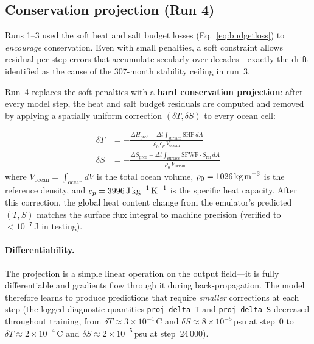 \documentclass[11pt]{article}
\begin{document}
\subsection{Conservation projection (Run 4)}
\label{sec:conservproj}

Runs 1--3 used the soft heat and salt budget losses (Eq.~\ref{eq:budgetloss}) to
\emph{encourage} conservation. Even with small penalties, a soft constraint allows
residual per-step errors that accumulate secularly over decades---exactly the drift
identified as the cause of the 307-month stability ceiling in run~3.

Run~4 replaces the soft penalties with a \textbf{hard conservation projection}: after
every model step, the heat and salt budget residuals are computed and removed by applying
a spatially uniform correction $(\delta T, \delta S)$ to every ocean cell:

\begin{align}
\delta T &= -\frac{\Delta H_\text{pred} - \Delta t \int_\text{surface} \text{SHF}\,dA}
                  {\rho_0\,c_p\,V_\text{ocean}}
\label{eq:projdT}\\
\delta S &= -\frac{\Delta S_\text{pred} - \Delta t \int_\text{surface} \text{SFWF}\cdot S_\text{ref}\,dA}
                  {\rho_0\,V_\text{ocean}}
\label{eq:projdS}
\end{align}
where $V_\text{ocean} = \int_\text{ocean} dV$ is the total ocean volume,
$\rho_0 = 1026\,\text{kg\,m}^{-3}$ is the reference density, and
$c_p = 3996\,\text{J\,kg}^{-1}\,\text{K}^{-1}$ is the specific heat capacity.
After this correction, the global heat content change from the emulator's predicted
$(T,S)$ matches the surface flux integral to machine precision (verified to
$< 10^{-7}\,\text{J}$ in testing).

\paragraph{Differentiability.}
The projection is a simple linear operation on the output field---it is fully
differentiable and gradients flow through it during back-propagation. The model
therefore learns to produce predictions that require \emph{smaller} corrections
at each step (the logged diagnostic quantities \texttt{proj\_delta\_T} and
\texttt{proj\_delta\_S} decreased throughout training, from
$\delta T \approx 3\times10^{-4}$\,\textdegree C and
$\delta S \approx 8\times10^{-5}$\,psu at step~0 to
$\delta T \approx 2\times10^{-4}$\,\textdegree C and
$\delta S \approx 2\times10^{-5}$\,psu at step~24\,000).
\end{document}
